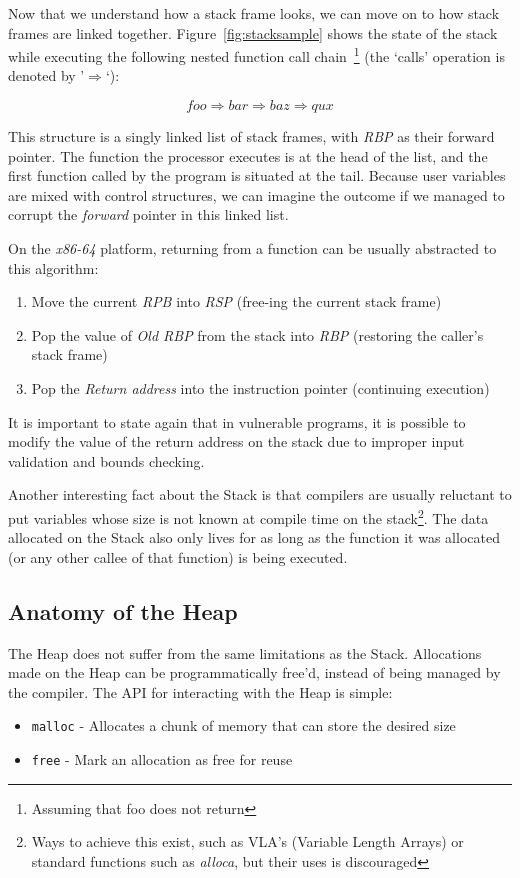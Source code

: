 \documentclass{article}
\begin{document}
Now that we understand how a stack frame looks, we can move on to how stack frames are linked together. Figure~\ref{fig:stacksample} shows the state of the stack while executing the following nested function call chain~\footnote{Assuming that foo does not return} (the `calls' operation is denoted by '$\Rightarrow$`):

\begin{equation}
  foo \Rightarrow bar \Rightarrow baz \Rightarrow qux
\end{equation}

This structure is a singly linked list of stack frames, with \emph{RBP} as their forward pointer. The function the processor executes is at the head of the list, and the first function called by the program is situated at the tail. Because user variables are mixed with control structures, we can imagine the outcome if we managed to corrupt the \emph{forward} pointer in this linked list.

On the \emph{x86-64} platform, returning from a function can be usually abstracted to this algorithm:
\begin{enumerate}
  \item Move the current \emph{RPB} into \emph{RSP} (free-ing the current stack frame)
  \item Pop the value of \emph{Old RBP} from the stack into \emph{RBP} (restoring the caller's stack frame)
  \item Pop the \emph{Return address} into the instruction pointer (continuing execution)
\end{enumerate}

It is important to state again that in vulnerable programs, it is possible to modify the value of the return address on the stack due to improper input validation and bounds checking.

Another interesting fact about the Stack is that compilers are usually reluctant to put variables whose size is not known at compile time on the stack\footnote{Ways to achieve this exist, such as VLA's (Variable Length Arrays) or standard functions such as \emph{alloca}, but their uses is discouraged\cite{TorvaldsVLA}}. The data allocated on the Stack also only lives for as long as the function it was allocated (or any other callee of that function) is being executed.

\subsection{Anatomy of the Heap}
The Heap does not suffer from the same limitations as the Stack. Allocations made on the Heap can be programmatically free'd, instead of being managed by the compiler. The API for interacting with the Heap is simple:
\begin{itemize}
  \item \texttt{malloc} - Allocates a chunk of memory that can store the desired size
  \item \texttt{free} - Mark an allocation as free for reuse
\end{itemize}
\end{document}
